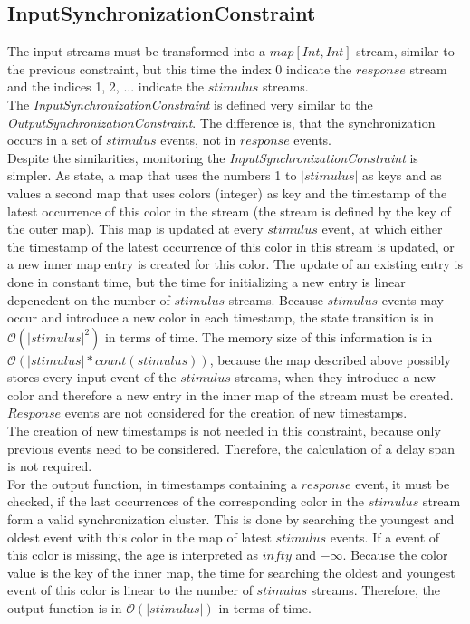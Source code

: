 \subsection{InputSynchronizationConstraint}
	The input streams must be transformed into a $map[Int, Int]$ stream, similar to the previous constraint, but this time the index 0 indicate the $response$ stream and the indices 1, 2, ... indicate the $stimulus$ streams.\\
	The \emph{InputSynchronizationConstraint} is defined very similar to the \emph{OutputSynchronizationConstraint}. The difference is, that the synchronization occurs in a set of $stimulus$ events, not in $response$ events.\\
	Despite the similarities, monitoring the \emph{InputSynchronizationConstraint} is simpler. As state, a map that uses the numbers 1 to $|stimulus|$ as keys and as values a second map that uses colors (integer) as key and the timestamp of the latest occurrence of this color in the stream (the stream is defined by the key of the outer map). This map is updated at every $stimulus$ event, at which either the timestamp of the latest occurrence of this color in this stream is updated, or a new inner map entry is created for this color.  The update of an existing entry is done in constant time, but the time for initializing a new entry is linear depenedent on the number of $stimulus$ streams. Because $stimulus$ events may occur and introduce a new color in each timestamp, the state transition is in $\mathcal{O}(|stimulus|^2)$ in terms of time. The memory size of this information is in $\mathcal{O}(|stimulus|*count(stimulus))$, because the map described above possibly stores every input event of the $stimulus$ streams, when they introduce a new color and therefore a new entry in the inner map of the stream must be created. $Response$ events are not considered for the creation of new timestamps.\\
	The creation of new timestamps is not needed in this constraint, because only previous events need to be considered. Therefore, the calculation of a delay span is not required.\\
	For the output function, in timestamps containing a $response$ event, it must be checked, if the last occurrences of the corresponding color in the $stimulus$ stream form a valid synchronization cluster. This is done by searching the youngest and oldest event with this color in the map of latest $stimulus$ events. If a event of this color is missing, the age is interpreted as $infty$ and $-\infty$. Because the color value is the key of the inner map, the time for searching the oldest and youngest event of this color is linear to the number of $stimulus$ streams. Therefore, the output function is in $\mathcal{O}(|stimulus|)$ in terms of time.
	
